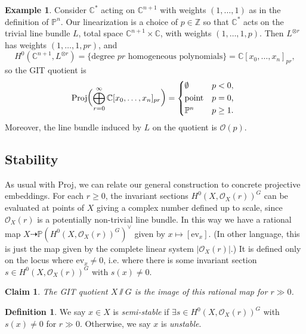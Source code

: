 \documentclass{article}
\newtheorem*{claim}{Claim}
\theoremstyle{definition}
\newtheorem*{definition}{Definition}
\newtheorem*{example}{Example}
\DeclareMathOperator{\Proj}{Proj}
\newcommand{\ev}{\mathrm{ev}}
\renewcommand{\O}{\mathcal{O}}
\renewcommand{\P}{\mathbb{P}}
\newcommand{\Z}{\mathbb{Z}}
\newcommand{\C}{\mathbb{C}}
\begin{document}
\begin{example}
    Consider $\C^*$ acting on $\C^{n+1}$ with weights $(1,\ldots,1)$ as in the
    definition of $\P^n$. Our linearization is a choice of $p\in\Z$ so that
    $\C^*$ acts on the trivial line bundle $L$, total space $\C^{n+1}\times\C$,
    with weights $(1,\ldots,1,p)$. Then $L^{\otimes r}$ has weights
    $(1,\ldots,1,pr)$, and
    \begin{equation*}
        H^0(\C^{n+1},L^{\otimes r})
            = \{\text{degree $pr$ homogeneous polynomials}\}
            = \C[x_0,\ldots,x_n]_{pr},
    \end{equation*}
    so the GIT quotient is
    \begin{equation*}
        \Proj\biggl(\bigoplus_{r=0}^\infty\C[x_0,\ldots,x_n]_{pr}\biggr)
            = \begin{cases*}
                \emptyset & $p<0$, \\
                \text{point} & $p=0$, \\
                \P^n & $p\ge1$.
            \end{cases*}
    \end{equation*}
    Moreover, the line bundle induced by $L$ on the quotient is $\O(p)$.
\end{example}

\subsection*{Stability}

As usual with Proj, we can relate our general construction to concrete
projective embeddings. For each $r\ge0$, the invariant sections
$H^0(X,\O_X(r))^G$ can be evaluated at points of $X$ giving a complex number
defined up to scale, since $\O_X(r)$ is a potentially non-trivial line bundle.
In this way we have a rational map $X\dashrightarrow\P(H^0(X,\O_X(r))^G)^\vee$
given by $x\mapsto[\ev_x]$. (In other language, this is just the map given by
the complete linear system $|\O_X(r)|$.) It is defined only on the locus where
$\ev_x\ne0$, i.e. where there is some invariant section $s\in H^0(X,\O_X(r))^G$
with $s(x)\ne0$.

\begin{claim}
    The GIT quotient $X\sslash G$ is the image of this rational map for $r\gg0$.
\end{claim}

\begin{definition}
    We say $x\in X$ is \emph{semi-stable} if $\exists s\in H^0(X,\O_X(r))^G$
    with $s(x)\ne0$ for $r\gg0$. Otherwise, we say $x$ is \emph{unstable}.
\end{definition}
\end{document}
